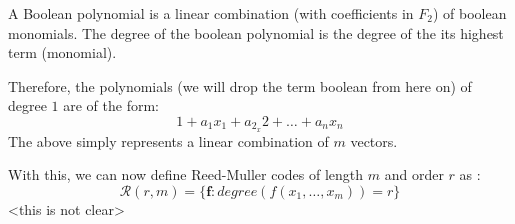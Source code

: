 \documentclass{article}
\newcommand{\RM}[2]{\ensuremath{\mathcal{R}(#1,#2)}}
\newcommand{\rem}{Reed-Muller}
\newcommand{\V}[1]{\ensuremath{\mathbf{#1}}}
\theoremstyle{plain}
\begin{document}
A Boolean polynomial is a linear combination (with coefficients in $F_2$) of boolean monomials. The degree of the boolean polynomial is the degree of the its highest term (monomial).

Therefore, the polynomials (we will drop the term boolean from here on) of degree $1$ are of the form:
\begin{equation}
 1+a_1x_1+a_2_x2+\ldots+a_nx_n
\end{equation}
The above simply represents a linear combination of $m$ vectors.

With this, we can now define \rem{} codes of length $m$ and order $r$  as :
\begin{equation}
\RM{r}{m} = \{\V{f} : degree(f(x_1,\ldots,x_m)) = r \} 
\end{equation}
<this is not clear>
\end{document}
